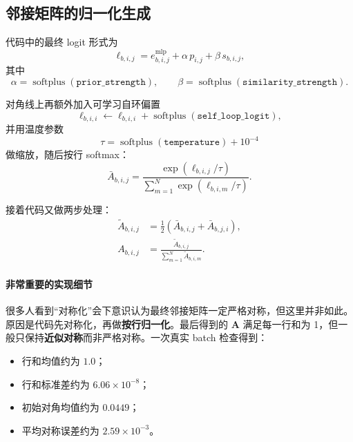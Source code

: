 \documentclass[UTF8]{ctexart}
\begin{document}
\subsection{邻接矩阵的归一化生成}

代码中的最终 logit 形式为
\begin{equation}
    \ell_{b,i,j}
    =
    e^{\text{mlp}}_{b,i,j}
    +
    \alpha \, p_{i,j}
    +
    \beta \, s_{b,i,j},
\end{equation}
其中
\begin{equation}
    \alpha = \operatorname{softplus}(\texttt{prior\_strength}),
    \qquad
    \beta = \operatorname{softplus}(\texttt{similarity\_strength}).
\end{equation}

对角线上再额外加入可学习自环偏置
\begin{equation}
    \ell_{b,i,i} \leftarrow \ell_{b,i,i} + \operatorname{softplus}(\texttt{self\_loop\_logit}),
\end{equation}
并用温度参数
\begin{equation}
    \tau = \operatorname{softplus}(\texttt{temperature}) + 10^{-4}
\end{equation}
做缩放，随后按行 softmax：
\begin{equation}
    \bar{A}_{b,i,j}
    =
    \frac{\exp(\ell_{b,i,j}/\tau)}
    {\sum_{m=1}^{N}\exp(\ell_{b,i,m}/\tau)}.
\end{equation}

接着代码又做两步处理：
\begin{align}
    \tilde{A}_{b,i,j} &= \frac{1}{2}\left(\bar{A}_{b,i,j} + \bar{A}_{b,j,i}\right), \\
    A_{b,i,j} &= \frac{\tilde{A}_{b,i,j}}{\sum_{m=1}^{N}\tilde{A}_{b,i,m}}.
\end{align}

\paragraph{非常重要的实现细节}
很多人看到“对称化”会下意识认为最终邻接矩阵一定严格对称，但这里并非如此。原因是代码先对称化，再做\textbf{按行归一化}。最后得到的 \(\bm{A}\) 满足每一行和为 1，但一般只保持\textbf{近似对称}而非严格对称。一次真实 batch 检查得到：
\begin{itemize}
    \item 行和均值约为 \(1.0\)；
    \item 行和标准差约为 \(6.06 \times 10^{-8}\)；
    \item 初始对角均值约为 \(0.0449\)；
    \item 平均对称误差约为 \(2.59 \times 10^{-3}\)。
\end{itemize}
\end{document}
